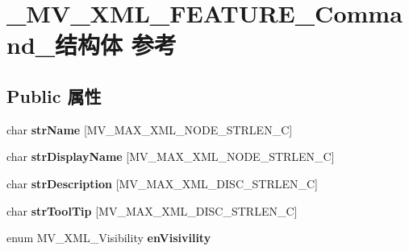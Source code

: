 \hypertarget{struct___m_v___x_m_l___f_e_a_t_u_r_e___command__}{}\section{\+\_\+\+M\+V\+\_\+\+X\+M\+L\+\_\+\+F\+E\+A\+T\+U\+R\+E\+\_\+\+Command\+\_\+结构体 参考}
\label{struct___m_v___x_m_l___f_e_a_t_u_r_e___command__}
\subsection*{Public 属性}
\begin{DoxyCompactItemize}
\item 
\mbox{\label{struct___m_v___x_m_l___f_e_a_t_u_r_e___command___adfaad6104e084d1d698d9dd7d6ba0b01}} 
char {\bfseries str\+Name} \mbox{[}M\+V\+\_\+\+M\+A\+X\+\_\+\+X\+M\+L\+\_\+\+N\+O\+D\+E\+\_\+\+S\+T\+R\+L\+E\+N\+\_\+C\mbox{]}
\item 
\mbox{\label{struct___m_v___x_m_l___f_e_a_t_u_r_e___command___a5ca9036eea9be00c2183cc222bdbd3cc}} 
char {\bfseries str\+Display\+Name} \mbox{[}M\+V\+\_\+\+M\+A\+X\+\_\+\+X\+M\+L\+\_\+\+N\+O\+D\+E\+\_\+\+S\+T\+R\+L\+E\+N\+\_\+C\mbox{]}
\item 
\mbox{\label{struct___m_v___x_m_l___f_e_a_t_u_r_e___command___a86766c6816b8c0c4abe0c9886a7bdaa3}} 
char {\bfseries str\+Description} \mbox{[}M\+V\+\_\+\+M\+A\+X\+\_\+\+X\+M\+L\+\_\+\+D\+I\+S\+C\+\_\+\+S\+T\+R\+L\+E\+N\+\_\+C\mbox{]}
\item 
\mbox{\label{struct___m_v___x_m_l___f_e_a_t_u_r_e___command___ae484c9f0bed4d7609e05fd1175755588}} 
char {\bfseries str\+Tool\+Tip} \mbox{[}M\+V\+\_\+\+M\+A\+X\+\_\+\+X\+M\+L\+\_\+\+D\+I\+S\+C\+\_\+\+S\+T\+R\+L\+E\+N\+\_\+C\mbox{]}
\item 
\mbox{\label{struct___m_v___x_m_l___f_e_a_t_u_r_e___command___a62b3be094e3db4adcb20cde8d74dcb13}} 
enum M\+V\+\_\+\+X\+M\+L\+\_\+\+Visibility {\bfseries en\+Visivility}

\end{DoxyCompactItemize}
